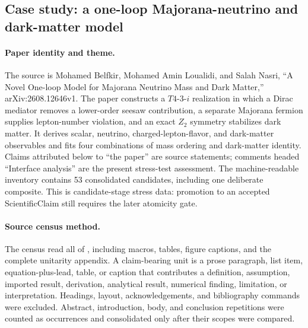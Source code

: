 \subsection{Case study: a one-loop Majorana-neutrino and dark-matter model}
\label{case:2608-12646}

\paragraph{Paper identity and theme.}
The source is Mohamed Belfkir, Mohamed Amin Loualidi, and Salah Nasri,
``A Novel One-loop Model for Majorana Neutrino Mass and Dark Matter,''
arXiv:2608.12646v1. The paper constructs a $T4$-$3$-$i$ realization in
which a Dirac mediator removes a lower-order seesaw contribution, a separate
Majorana fermion supplies lepton-number violation, and an exact $Z_2$ symmetry
stabilizes dark matter. It derives scalar, neutrino, charged-lepton-flavor,
and dark-matter observables and fits four combinations of mass ordering and
dark-matter identity. Claims attributed below to ``the paper'' are source
statements; comments headed ``Interface analysis'' are the present stress-test
assessment. The machine-readable inventory contains 53 consolidated candidates, including one deliberate composite. This is candidate-stage stress data: promotion to an accepted ScientificClaim still requires the later atomicity gate.

\paragraph{Source census method.}
The census read all of
, including
macros, tables, figure captions, and the complete unitarity appendix. A
claim-bearing unit is a prose paragraph, list item, equation-plus-lead, table,
or caption that contributes a definition, assumption, imported result,
derivation, analytical result, numerical finding, limitation, or
interpretation. Headings, layout, acknowledgements, and bibliography commands
were excluded. Abstract, introduction, body, and conclusion repetitions were
counted as occurrences and consolidated only after their scopes were compared.

